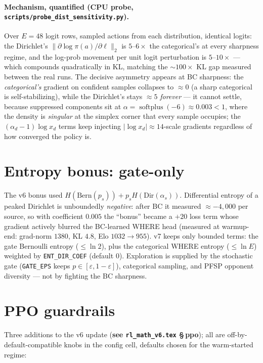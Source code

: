 \documentclass[11pt]{article}
\newcommand{\softplus}{\operatorname{softplus}}
\newcommand{\cd}[1]{\texttt{#1}}
\newcommand{\vsixref}[1]{\textbf{see \texttt{rl\_math\_v6.tex} \S\,#1}}
\begin{document}
\paragraph{Mechanism, quantified (CPU probe, \cd{scripts/probe\_dist\_sensitivity.py}).}
Over $E{=}48$ logit rows, sampled actions from each distribution, identical logits: the Dirichlet's
$\|\partial \log\pi(a)/\partial \ell\|_2$ is $5$--$6\times$ the categorical's at every sharpness
regime, and the log-prob movement per unit logit perturbation is $5$--$10\times$ --- which
compounds quadratically in KL, matching the $\sim$$100\times$ KL gap measured between the real
runs. The decisive asymmetry appears at BC sharpness: the \emph{categorical's} gradient on
confident samples collapses to $\approx 0$ (a sharp categorical is self-stabilizing), while the
Dirichlet's stays $\approx 5$ \emph{forever} --- it cannot settle, because suppressed components
sit at $\alpha = \softplus(-6) \approx 0.003 < 1$, where the density is \emph{singular} at the
simplex corner that every sample occupies; the $(\alpha_d{-}1)\log x_d$ terms keep injecting
$|\log x_d| \approx 14$-scale gradients regardless of how converged the policy is.

\section{Entropy bonus: gate-only}\label{v7:ent}
The v6 bonus used $H(\text{Bern}(p_s)) + p_s H(\text{Dir}(\alpha_s))$. Differential entropy of a
peaked Dirichlet is unboundedly \emph{negative}: after BC it measured $\approx -4{,}000$ per source,
so with coefficient $0.005$ the ``bonus'' became a $+20$ loss term whose gradient actively blurred
the BC-learned WHERE head (measured at warmup-end: grad-norm $1380$, KL $4.8$, Elo
$1032\!\to\!955$). v7 keeps only bounded terms: the gate Bernoulli entropy
($\le \ln 2$), plus the categorical WHERE entropy ($\le \ln E$) weighted by
\cd{ENT\_DIR\_COEF} (default $0$). Exploration is supplied by the stochastic gate
(\cd{GATE\_EPS} keeps $p\in[\varepsilon,1{-}\varepsilon]$), categorical sampling, and PFSP opponent
diversity --- not by fighting the BC sharpness.

\section{PPO guardrails}\label{v7:guard}

Three additions to the v6 update (\vsixref{ppo}); all are off-by-default-compatible knobs in the
config cell, defaults chosen for the warm-started regime:
\end{document}
